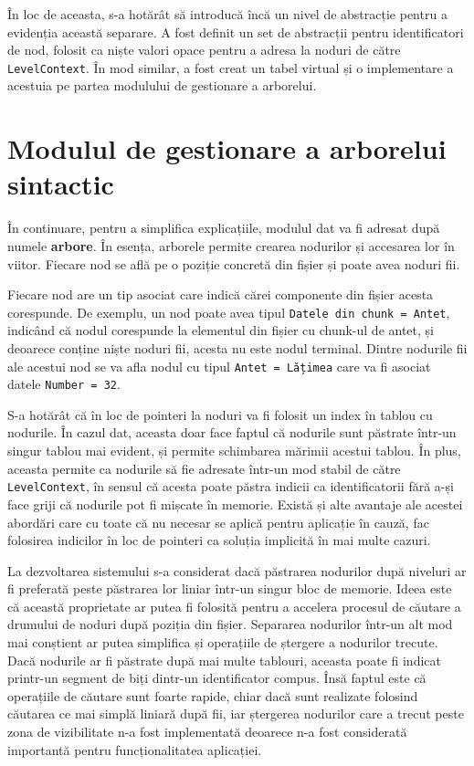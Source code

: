 \documentclass[a4paper,12pt]{report}
\begin{document}
În loc de aceasta, s-a hotărât să introducă încă un nivel de abstracție pentru a evidenția această separare.
A fost definit un set de abstracții pentru identificatori de nod,
folosit ca niște valori opace pentru a adresa la noduri de către \texttt{LevelContext}.
În mod similar, a fost creat un tabel virtual și o implementare a acestuia pe partea modulului de gestionare a arborelui.

\section{Modulul de gestionare a arborelui sintactic}

În continuare, pentru a simplifica explicațiile, modulul dat va fi adresat după numele \textbf{arbore}.
În esența, arborele permite crearea nodurilor și accesarea lor în viitor.
Fiecare nod se află pe o poziție concretă din fișier și poate avea noduri fii.

Fiecare nod are un tip asociat care indică cărei componente din fișier acesta corespunde.
De exemplu, un nod poate avea tipul \texttt{Datele din chunk = Antet},
indicând că nodul corespunde la elementul din fișier cu chunk-ul de antet,
și deoarece conține niște noduri fii, acesta nu este nodul terminal.
Dintre nodurile fii ale acestui nod se va afla nodul cu tipul \texttt{Antet = Lățimea}
care va fi asociat datele \texttt{Number = 32}.

S-a hotărât că în loc de pointeri la noduri va fi folosit un index în tablou cu nodurile.
În cazul dat, aceasta doar face faptul că nodurile sunt păstrate într-un singur tablou mai evident,
și permite schimbarea mărimii acestui tablou.
În plus, aceasta permite ca nodurile să fie adresate într-un mod stabil de către \texttt{LevelContext},
în sensul că acesta poate păstra indicii ca identificatorii fără a-și face griji că nodurile pot fi mișcate în memorie.
Există și alte avantaje ale acestei abordări care cu toate că nu necesar se aplică pentru aplicație în cauză,
fac folosirea indicilor în loc de pointeri ca soluția implicită în mai multe cazuri.

La dezvoltarea sistemului s-a considerat dacă păstrarea nodurilor după niveluri ar fi preferată
peste păstrarea lor liniar într-un singur bloc de memorie.
Ideea este că această proprietate ar putea fi folosită pentru a accelera procesul de căutare
a drumului de noduri după poziția din fișier.
Separarea nodurilor într-un alt mod mai conștient ar putea simplifica
și operațiile de ștergere a nodurilor trecute.
Dacă nodurile ar fi păstrate după mai multe tablouri,
aceasta poate fi indicat printr-un segment de biți dintr-un identificator compus.
Însă faptul este că operațiile de căutare sunt foarte rapide,
chiar dacă sunt realizate folosind căutarea ce mai simplă liniară după fii,
iar ștergerea nodurilor care a trecut peste zona de vizibilitate
n-a fost implementată deoarece n-a fost considerată importantă pentru funcționalitatea aplicației.
\end{document}

